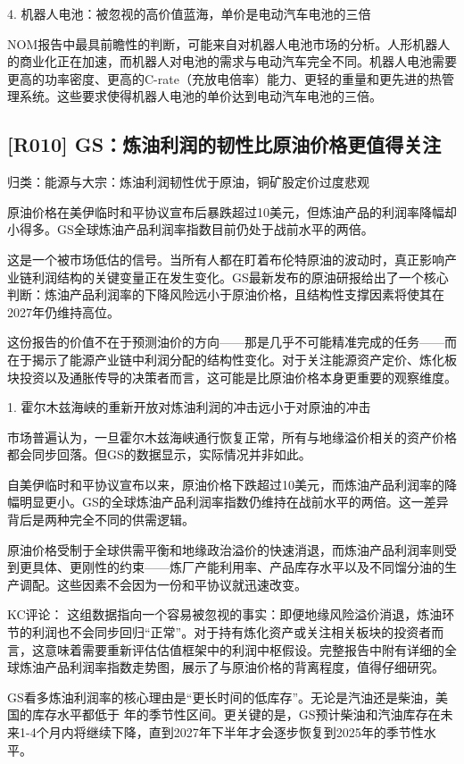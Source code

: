 \documentclass[11pt]{ctexart}
\begin{document}
4. 机器人电池：被忽视的高价值蓝海，单价是电动汽车电池的三倍

NOM报告中最具前瞻性的判断，可能来自对机器人电池市场的分析。人形机器人的商业化正在加速，而机器人对电池的需求与电动汽车完全不同。机器人电池需要更高的功率密度、更高的C-rate（充放电倍率）能力、更轻的重量和更先进的热管理系统。这些要求使得机器人电池的单价达到电动汽车电池的三倍。

\subsection{[R010] GS：炼油利润的韧性比原油价格更值得关注}
{\small\color{refgray}归类：能源与大宗：炼油利润韧性优于原油，铜矿股定价过度悲观}

原油价格在美伊临时和平协议宣布后暴跌超过10美元，但炼油产品的利润率降幅却小得多。GS全球炼油产品利润率指数目前仍处于战前水平的两倍。

这是一个被市场低估的信号。当所有人都在盯着布伦特原油的波动时，真正影响产业链利润结构的关键变量正在发生变化。GS最新发布的原油研报给出了一个核心判断：炼油产品利润率的下降风险远小于原油价格，且结构性支撑因素将使其在2027年仍维持高位。

这份报告的价值不在于预测油价的方向——那是几乎不可能精准完成的任务——而在于揭示了能源产业链中利润分配的结构性变化。对于关注能源资产定价、炼化板块投资以及通胀传导的决策者而言，这可能是比原油价格本身更重要的观察维度。

1. 霍尔木兹海峡的重新开放对炼油利润的冲击远小于对原油的冲击

市场普遍认为，一旦霍尔木兹海峡通行恢复正常，所有与地缘溢价相关的资产价格都会同步回落。但GS的数据显示，实际情况并非如此。

自美伊临时和平协议宣布以来，原油价格下跌超过10美元，而炼油产品利润率的降幅明显更小。GS的全球炼油产品利润率指数仍维持在战前水平的两倍。这一差异背后是两种完全不同的供需逻辑。

原油价格受制于全球供需平衡和地缘政治溢价的快速消退，而炼油产品利润率则受到更具体、更刚性的约束——炼厂产能利用率、产品库存水平以及不同馏分油的生产调配。这些因素不会因为一份和平协议就迅速改变。

KC评论： 这组数据指向一个容易被忽视的事实：即便地缘风险溢价消退，炼油环节的利润也不会同步回归“正常”。对于持有炼化资产或关注相关板块的投资者而言，这意味着需要重新评估估值框架中的利润中枢假设。完整报告中附有详细的全球炼油产品利润率指数走势图，展示了与原油价格的背离程度，值得仔细研究。

GS看多炼油利润率的核心理由是“更长时间的低库存”。无论是汽油还是柴油，美国的库存水平都低于 年的季节性区间。更关键的是，GS预计柴油和汽油库存在未来1-4个月内将继续下降，直到2027年下半年才会逐步恢复到2025年的季节性水平。
\end{document}
